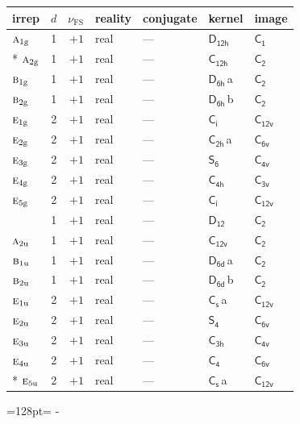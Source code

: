 \documentclass[10pt,a4paper]{article}
\newcommand{\needspace}[1]{\par\penalty-100\begingroup\dimen0=#1\relax\dimen2=\pagegoal
  \advance\dimen2-\pagetotal\ifdim\dimen0>\dimen2\relax\ifdim\dimen2>0pt\vfil\break\fi\fi
  \endgroup}
\numberwithin{equation}{section}
\newcommand{\grp}[1]{\mathsf{#1}}
\newcommand{\irr}[1]{\text{\normalfont\scshape #1}}
\newcommand{\detbox}[1]{{\setlength{\fboxsep}{1pt}\fbox{#1}}}
\newcommand{\ptag}[1]{\mathrm{#1}}
\newcommand{\clsletter}[1]{\,{\scriptsize\color{black!55}#1}}
\newcommand{\fsind}{\nu_{\mathrm{FS}}}
\begin{document}
{\small\renewcommand{\arraystretch}{1.25}\begin{longtable}{@{}lrrllll@{}}\toprule
irrep & $d$ & $\fsind$ & reality & conjugate & kernel & image\\\midrule\endhead
\bottomrule\endfoot\endlastfoot
$\irr{a}_{1\ptag{g}}$ & 1 & $+1$ & real & --- & \href{D12h.pdf}{$\grp{D_{12h}}$} & \href{C1.pdf}{$\grp{C_{1}}$}\\*
$\irr{a}_{2\ptag{g}}$ & 1 & $+1$ & real & --- & \href{C12h.pdf}{$\grp{C_{12h}}$} & \href{C2.pdf}{$\grp{C_{2}}$}\\
$\irr{b}_{1\ptag{g}}$ & 1 & $+1$ & real & --- & \href{D6h.pdf}{$\grp{D_{6h}}$}\clsletter{a} & \href{C2.pdf}{$\grp{C_{2}}$}\\
$\irr{b}_{2\ptag{g}}$ & 1 & $+1$ & real & --- & \href{D6h.pdf}{$\grp{D_{6h}}$}\clsletter{b} & \href{C2.pdf}{$\grp{C_{2}}$}\\
$\irr{e}_{1\ptag{g}}$ & 2 & $+1$ & real & --- & \href{S2.pdf}{$\grp{C_{i}}$} & \href{C12v.pdf}{$\grp{C_{12v}}$}\\
$\irr{e}_{2\ptag{g}}$ & 2 & $+1$ & real & --- & \href{C2h.pdf}{$\grp{C_{2h}}$}\clsletter{a} & \href{C6v.pdf}{$\grp{C_{6v}}$}\\
$\irr{e}_{3\ptag{g}}$ & 2 & $+1$ & real & --- & \href{S6.pdf}{$\grp{S_{6}}$} & \href{C4v.pdf}{$\grp{C_{4v}}$}\\
$\irr{e}_{4\ptag{g}}$ & 2 & $+1$ & real & --- & \href{C4h.pdf}{$\grp{C_{4h}}$} & \href{C3v.pdf}{$\grp{C_{3v}}$}\\
$\irr{e}_{5\ptag{g}}$ & 2 & $+1$ & real & --- & \href{S2.pdf}{$\grp{C_{i}}$} & \href{C12v.pdf}{$\grp{C_{12v}}$}\\
\detbox{$\irr{a}_{1\ptag{u}}$} & 1 & $+1$ & real & --- & \href{D12.pdf}{$\grp{D_{12}}$} & \href{C2.pdf}{$\grp{C_{2}}$}\\
$\irr{a}_{2\ptag{u}}$ & 1 & $+1$ & real & --- & \href{C12v.pdf}{$\grp{C_{12v}}$} & \href{C2.pdf}{$\grp{C_{2}}$}\\
$\irr{b}_{1\ptag{u}}$ & 1 & $+1$ & real & --- & \href{D6d.pdf}{$\grp{D_{6d}}$}\clsletter{a} & \href{C2.pdf}{$\grp{C_{2}}$}\\
$\irr{b}_{2\ptag{u}}$ & 1 & $+1$ & real & --- & \href{D6d.pdf}{$\grp{D_{6d}}$}\clsletter{b} & \href{C2.pdf}{$\grp{C_{2}}$}\\
$\irr{e}_{1\ptag{u}}$ & 2 & $+1$ & real & --- & \href{C1v.pdf}{$\grp{C_{s}}$}\clsletter{a} & \href{C12v.pdf}{$\grp{C_{12v}}$}\\
$\irr{e}_{2\ptag{u}}$ & 2 & $+1$ & real & --- & \href{S4.pdf}{$\grp{S_{4}}$} & \href{C6v.pdf}{$\grp{C_{6v}}$}\\
$\irr{e}_{3\ptag{u}}$ & 2 & $+1$ & real & --- & \href{C3h.pdf}{$\grp{C_{3h}}$} & \href{C4v.pdf}{$\grp{C_{4v}}$}\\
$\irr{e}_{4\ptag{u}}$ & 2 & $+1$ & real & --- & \href{C4.pdf}{$\grp{C_{4}}$} & \href{C6v.pdf}{$\grp{C_{6v}}$}\\*
$\irr{e}_{5\ptag{u}}$ & 2 & $+1$ & real & --- & \href{C1v.pdf}{$\grp{C_{s}}$}\clsletter{a} & \href{C12v.pdf}{$\grp{C_{12v}}$}\\
\bottomrule\end{longtable}}
\needspace{128pt}
\end{document}
